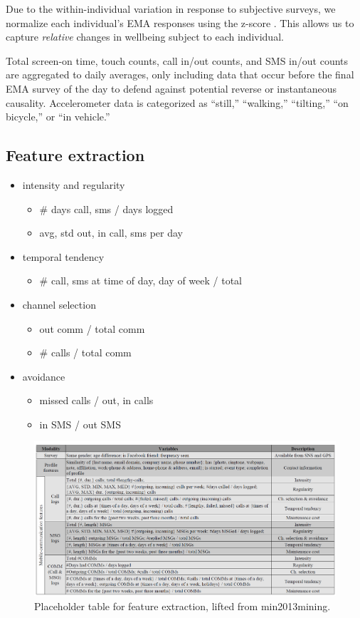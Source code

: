 \documentclass{article}
\begin{document}
Due to the within-individual variation in response to subjective surveys, we normalize each individual's EMA responses using the z-score \cite{austin1998individual}. This allows us to capture \textit{relative} changes in wellbeing subject to each individual. 

Total screen-on time, touch counts, call in/out counts, and SMS in/out counts are aggregated to daily averages, only including data that occur before the final EMA survey of the day to defend against potential reverse or instantaneous causality. Accelerometer data is categorized as ``still,'' ``walking,'' ``tilting,'' ``on bicycle,'' or ``in vehicle.''

\subsection{Feature extraction}
\begin{itemize}
\item intensity and regularity
    \begin{itemize}
        \item \# days {call, sms} / days logged
        \item {avg, std} {out, in} {call, sms} per day
    \end{itemize}
\item temporal tendency
    \begin{itemize}
        \item \# {call, sms} at {time of day, day of week} / total
    \end{itemize}
\item channel selection
    \begin{itemize}    
        \item out comm / total comm
        \item \# calls / total comm
    \end{itemize}
\item avoidance
    \begin{itemize}    
        \item missed calls / {out, in} calls
        \item in SMS / out SMS
    \end{itemize}
\end{itemize}

\begin{figure}[H]
    \centering
    \includegraphics[width=\textwidth]{figures/feature_extraction_placeholder.png}
    \caption{Placeholder table for feature extraction, lifted from min2013mining.}
\end{figure}
\end{document}

